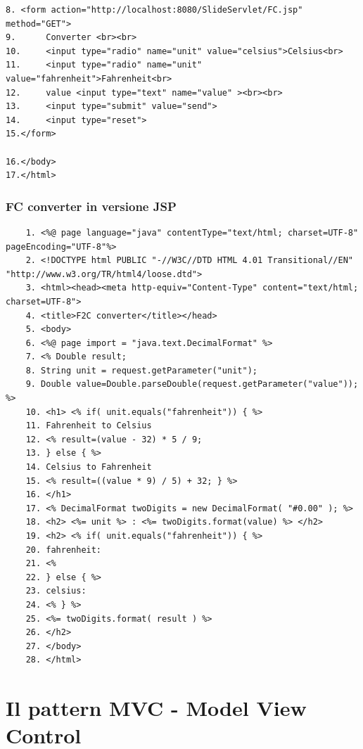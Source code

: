 \begin{itemize}
\begin{verbatim}
8. <form action="http://localhost:8080/SlideServlet/FC.jsp" method="GET">
9.      Converter <br><br>
10.     <input type="radio" name="unit" value="celsius">Celsius<br>
11.     <input type="radio" name="unit" value="fahrenheit">Fahrenheit<br>
12.     value <input type="text" name="value" ><br><br>
13.     <input type="submit" value="send">
14.     <input type="reset">
15.</form>

16.</body>
17.</html>
\end{verbatim}

\subsubsection{FC converter in versione JSP}
\begin{verbatim}
    1. <%@ page language="java" contentType="text/html; charset=UTF-8" pageEncoding="UTF-8"%>
    2. <!DOCTYPE html PUBLIC "-//W3C//DTD HTML 4.01 Transitional//EN" "http://www.w3.org/TR/html4/loose.dtd">
    3. <html><head><meta http-equiv="Content-Type" content="text/html; charset=UTF-8">
    4. <title>F2C converter</title></head>
    5. <body>
    6. <%@ page import = "java.text.DecimalFormat" %>
    7. <% Double result;
    8. String unit = request.getParameter("unit");
    9. Double value=Double.parseDouble(request.getParameter("value")); %>
    10. <h1> <% if( unit.equals("fahrenheit")) { %>
    11. Fahrenheit to Celsius
    12. <% result=(value - 32) * 5 / 9;
    13. } else { %>
    14. Celsius to Fahrenheit
    15. <% result=((value * 9) / 5) + 32; } %>
    16. </h1>
    17. <% DecimalFormat twoDigits = new DecimalFormat( "#0.00" ); %>
    18. <h2> <%= unit %> : <%= twoDigits.format(value) %> </h2>
    19. <h2> <% if( unit.equals("fahrenheit")) { %>
    20. fahrenheit:
    21. <%
    22. } else { %>
    23. celsius:
    24. <% } %>
    25. <%= twoDigits.format( result ) %>
    26. </h2>
    27. </body>
    28. </html>
\end{verbatim}

\section{Il pattern MVC - Model View Control}

\end{itemize}

